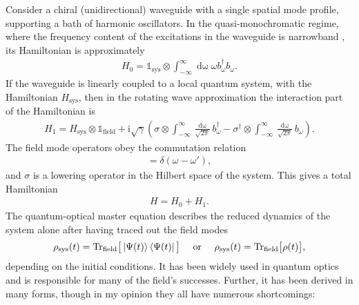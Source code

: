 \documentclass[%
 onecolumn,
 notitlepage,
 longbibliography,
 amsmath,amssymb,
 aps,
 pra,
 10pt,
]{revtex4-1}
\begin{document}
Consider a chiral (unidirectional) waveguide with a single spatial mode profile, supporting a bath of harmonic oscillators. In the quasi-monochromatic regime, where the frequency content of the excitations in the waveguide is narrowband \cite{fischer2017scattering}, its Hamiltonian is approximately
\begin{eqnarray}
H_0 = \mathbb{1}_\text{sys}\otimes\int_{-\infty}^{\infty} \mathop{\textrm{d}\omega}\omega b_\omega^\dagger b_\omega .
\end{eqnarray}
If the waveguide is linearly coupled to a local quantum system, with the Hamiltonian $H_\text{sys}$, then in the rotating wave approximation the interaction part of the Hamiltonian is
\begin{eqnarray}
H_1 = H_\text{sys}\otimes\mathbb{1}_\text{field} + \textrm{i}\sqrt{\gamma}\left(\sigma \otimes \int_{-\infty}^{\infty} \frac{\mathop{\textrm{d}\omega}}{\sqrt{2\pi}}b_\omega^\dagger -\sigma^\dagger \otimes \int_{-\infty}^{\infty} \frac{\mathop{\textrm{d}\omega}}{\sqrt{2\pi}}b_\omega \right).
\end{eqnarray}
The field mode operators obey the commutation relation
\begin{eqnarray}
[b_\omega, b^\dagger_{\omega'}]=\delta(\omega-\omega'),\label{eq:commute0}
\end{eqnarray}
and $\sigma$ is a lowering operator in the Hilbert space of the system. This gives a total Hamiltonian
\begin{eqnarray}
H=H_0+H_1.
\end{eqnarray}
The quantum-optical master equation describes the reduced dynamics of the system alone after having traced out the field modes
\begin{equation}
\rho_\text{sys}(t)=\text{Tr}_\text{field}\big[\ket{\Psi(t)}\bra{\Psi(t)}\big] \quad\text{ or }\quad \rho_\text{sys}(t)=\text{Tr}_\text{field}\big[\rho(t)\big],
\end{equation}
depending on the initial conditions. It has been widely used in quantum optics and is responsible for many of the field's successes. Further, it has been derived in many forms, though in my opinion they all have numerous shortcomings:
\end{document}
